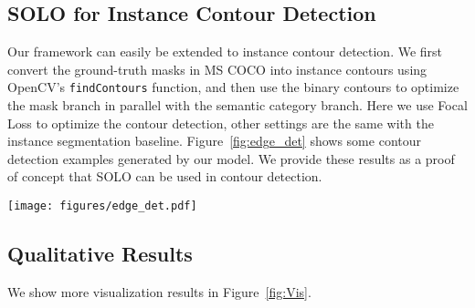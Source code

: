 \documentclass[runningheads]{llncs}
\def\method{{SOLO}\xspace}
\def\OurMethod{{SOLO}\xspace}
\begin{document}
\begin{table}
    \centering
     \caption{Mask R-CNN with Dice loss. The models are trained with``3'' schedule and evaluated on \texttt{val2017}. }
     \label{tab:maskrcnn_dice}
\end{table}


\subsection{\method for Instance Contour Detection}
Our framework can easily be extended to instance contour detection.
We first convert the ground-truth masks in MS COCO into instance contours using OpenCV's \texttt{findContours} function, and then use the binary contours to optimize the mask branch in parallel with the semantic category branch. Here we use Focal Loss to optimize the contour detection, other settings are the same with the instance segmentation baseline. Figure~\ref{fig:edge_det} shows some contour detection examples generated by our model.  We provide these results as a proof of concept that
\method can be used in contour detection.

\begin{figure*}[ht]
\begin{center}
    \texttt{[image: figures/edge\_det.pdf]}
\end{center}
   \caption{Visualization of \OurMethod for \textbf{instance contour detection}. The model is trained on COCO \texttt{train2017} dataset with ResNet-50-FPN. Each instance contour is shown in a
different
   color.}
\label{fig:edge_det}
\end{figure*}


\subsection{Qualitative Results}
We show more visualization results in Figure~\ref{fig:Vis}.



\def\visimgheight{2.6cm}
\def\visimgwidth{3.2cm}
\end{document}
